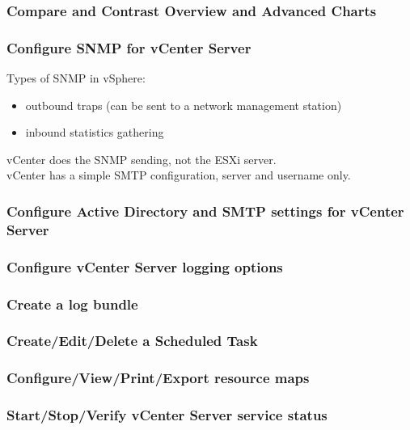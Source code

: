 \subsubsection{Compare and Contrast Overview and Advanced Charts}

\subsubsection{Configure SNMP for vCenter Server}

Types of SNMP in vSphere:

\begin{itemize}
\item outbound traps (can be sent to a network management station)
\item inbound statistics gathering
\end{itemize}

vCenter does the SNMP sending, not the ESXi server.\\

vCenter has a simple SMTP configuration, server and username only.

\subsubsection{Configure Active Directory and SMTP settings for vCenter Server}

\subsubsection{Configure vCenter Server logging options}

\subsubsection{Create a log bundle}

\subsubsection{Create/Edit/Delete a Scheduled Task}

\subsubsection{Configure/View/Print/Export resource maps}

\subsubsection{Start/Stop/Verify vCenter Server service status}

